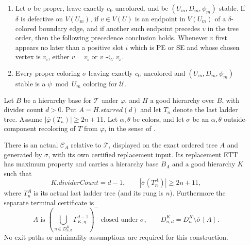 \begin{lemma}
\begin{enumerate}
$(\gamma_m,\delta_m)$ incidence component through $v$ meets $V(U_m)$
exactly in $v$.
\item Let $\sigma$ be proper, leave exactly $e_0$ uncolored, and be
$(U_m,D_m,\psi_m)$-stable.  If $\delta$ is defective on $V(U_m)$, if
$v\in V(U)$ is an endpoint in $V(U_m)$ of a $\delta$-colored boundary
edge, and if another such endpoint precedes $v$ in the tree order, then
the following precedence conclusion holds.  Whenever $v$ first appears
no later than a positive slot $i$ which is PE or SE and whose chosen
vertex is $v_i$, either $v=v_i$ or $v\prec_U v_i$.
\item Every proper coloring $\sigma$ leaving exactly $e_0$ uncolored and
$(U_m,D_m,\psi_m)$-stable is a $\psi\bmod U_m$ coloring for
$\mathcal U$.
\end{enumerate}


Let $B$ be a hierarchy base for $\mathcal T$ under $\varphi$, and $H$
a good hierarchy over $B$, with divider count $d>0$. Put
$A=H.\mathit{starred}(d)$ and let $T_n$ denote the last ladder tree.
Assume $|\overline\varphi(T_n)|\geq 2n+11$. Let $\alpha,\theta$ be colors,
and let $\sigma$ be an $\alpha,\theta$ outside-component recoloring of
$T$ from $\varphi$, in the sense of .

There is an actual 
$\mathcal C_A$ relative to $\mathcal T$, displayed on the exact ordered
tree $A$ and generated by $\sigma$, with its own certified replacement
input. Its replacement ETT has maximum property and carries a hierarchy
base $B_A$ and a good hierarchy $K$ such that
\[
 K.\mathit{dividerCount}=d-1,\qquad
 |\overline\sigma(T^{A}_n)|\geq 2n+11,
\]
where $T^{A}_n$ is its actual last ladder tree (and its rung is $n$).
Furthermore the separate terminal certificate is
\[
 A\text{ is }
 \left(\bigcup_{\eta\in D^K_{n,d}}\Gamma^{d-1}_{K,\eta}\right)^-
 \text{-closed under }\sigma,
 \qquad D^K_{n,d}=D^K_n\setminus\overline\sigma(A).
\]
No exit paths or minimality assumptions are required for this construction.
\end{lemma}

